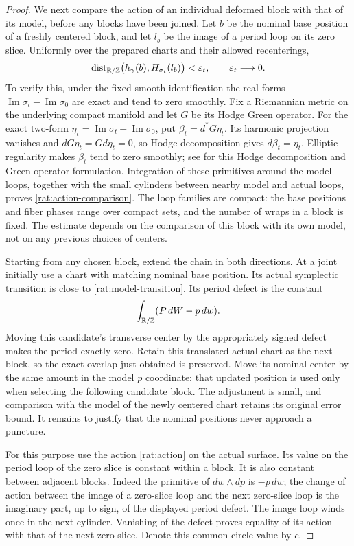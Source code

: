 \begin{proof}
We next compare the action of an individual deformed block with
that of its model, before any blocks have been joined. Let $b$ be
the nominal base position of a freshly centered block, and let
$l_b$ be the image of a period loop on its zero slice. Uniformly
over the prepared charts and their allowed recenterings,
\begin{equation}\label{rat:action-comparison}
 \operatorname{dist}_{\mathbb R/\mathbb Z}
    \bigl(h_\gamma(b),H_{\sigma_t}(l_b)\bigr)<\varepsilon_t,
 \qquad \varepsilon_t\longrightarrow0.
\end{equation}
To verify this, under the fixed smooth identification the real forms
$\operatorname{Im}\sigma_t-\operatorname{Im}\sigma_0$ are exact
and tend to zero smoothly. Fix a Riemannian metric on the underlying compact manifold and let
$G$ be its Hodge Green operator. For the exact two-form
$\eta_t=\operatorname{Im}\sigma_t-\operatorname{Im}\sigma_0$, put
$\beta_t=d^*G\eta_t$. Its harmonic projection vanishes and
$dG\eta_t=Gd\eta_t=0$, so Hodge decomposition gives $d\beta_t=\eta_t$.
Elliptic regularity makes $\beta_t$ tend to zero smoothly;
see \cite[Theorem~3.2 and Equation~(3.26)]{ChenLiHodge} for this
Hodge decomposition and Green-operator formulation. Integration of
these primitives around the model loops, together with the
small cylinders between nearby model and actual loops, proves
\eqref{rat:action-comparison}. The loop families are compact:
the base positions and fiber phases range over compact sets, and
the number of wraps in a block is fixed. The estimate depends on
the comparison of this block with its own model, not on any
previous choices of centers.

Starting from any chosen block, extend the chain in both
directions. At a joint initially use a chart with matching nominal
base position. Its actual symplectic transition is close to
\eqref{rat:model-transition}. Its period defect is the constant
\[
 \int_{\mathbb R/\mathbb Z}(P\,dW-p\,dw).
\]
Moving this candidate's transverse center by the appropriately
signed defect makes the period exactly zero. Retain this
translated actual chart as the next block, so the exact overlap
just obtained is preserved. Move its nominal center by the same
amount in the model $p$ coordinate; that updated position is used
only when selecting the following candidate block. The adjustment
is small, and comparison with the model of the newly centered
chart retains its original error bound. It remains to justify
that the nominal positions never approach a puncture.

For this purpose use the action \eqref{rat:action} on the actual
surface. Its value on the period loop of the zero slice is
constant within a block. It is also constant between adjacent
blocks. Indeed the primitive of $dw\wedge dp$ is $-p\,dw$;
the change of action between the image of a zero-slice loop and
the next zero-slice loop is the imaginary part, up to sign, of
the displayed period defect. The image loop winds once in the
next cylinder. Vanishing of the defect proves equality of its
action with that of the next zero slice. Denote this common
circle value by $c$.


\end{proof}
